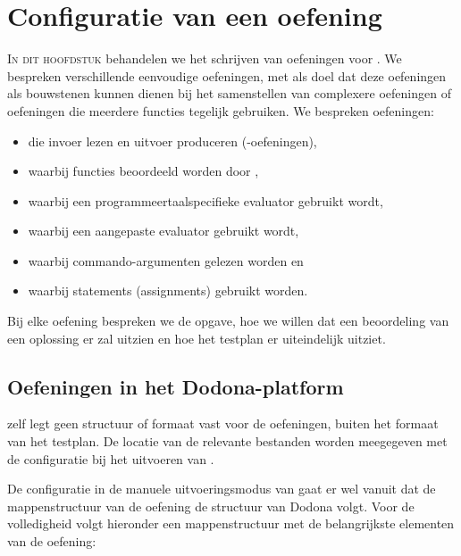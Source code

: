 \chapter{Configuratie van een oefening}\label{ch:nieuwe-oefening}

\lettrine{I}{n dit hoofdstuk} behandelen we het schrijven van oefeningen voor \tested{}.
We bespreken verschillende eenvoudige oefeningen, met als doel dat deze oefeningen als bouwstenen kunnen dienen bij het samenstellen van complexere oefeningen of oefeningen die meerdere functies tegelijk gebruiken.
We bespreken oefeningen:

\begin{itemize}
    \item die invoer lezen en uitvoer produceren (-oefeningen),
    \item waarbij functies beoordeeld worden door \tested{},
    \item waarbij een programmeertaalspecifieke evaluator gebruikt wordt,
    \item waarbij een aangepaste evaluator gebruikt wordt,
    \item waarbij commando-argumenten gelezen worden en
    \item waarbij statements (assignments) gebruikt worden.
\end{itemize}

Bij elke oefening bespreken we de opgave, hoe we willen dat een beoordeling van een oplossing er zal uitzien en hoe het testplan er uiteindelijk uitziet.

\section{Oefeningen in het Dodona-platform}\label{sec:oefeningen-in-het-dodona-platform}

\tested{} zelf legt geen structuur of formaat vast voor de oefeningen, buiten het formaat van het testplan.
De locatie van de relevante bestanden worden meegegeven met de configuratie bij het uitvoeren van \tested{}.

De configuratie in de manuele uitvoeringsmodus van \tested{} gaat er wel vanuit dat de mappenstructuur van de oefening de structuur van Dodona volgt.
Voor de volledigheid volgt hieronder een mappenstructuur met de belangrijkste elementen van de oefening:

\inputminted{text}{code/dirs-exercise.txt}

